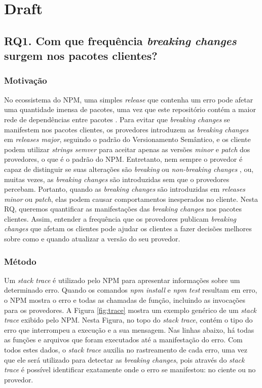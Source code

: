 \chapter{Draft}

\section{RQ1. Com que frequência \textit{breaking changes} surgem nos pacotes clientes?}
\label{sec:rq1}

\subsection{Motivação}
\label{mot:rq1}

No ecossistema do \gls{NPM}, uma simples \textit{release} que contenha um erro pode afetar uma quantidade imensa de pacotes, uma vez que este repositório contém a maior rede de dependências entre pacotes \cite{teorical_reference:npm_2}. Para evitar que \textit{breaking changes} se manifestem nos pacotes clientes, os provedores introduzem as \textit{breaking changes} em \textit{releases major}, seguindo o padrão do Versionamento Semântico, e os cliente podem utilizar \textit{strings semver} para aceitar apenas as versões \textit{minor} e \textit{patch} dos provedores, o que é o padrão do \gls{NPM}. Entretanto, nem sempre o provedor é capaz de distinguir se suas alterações são \textit{breaking} ou \textit{non-breaking changes} \cite{noregrets2018}, ou, muitas vezes, as \textit{breaking changes} são introduzidas sem que o provedores percebam. Portanto, quando as \textit{breaking changes} são introduzidas em \textit{releases minor} ou \textit{patch}, elas podem causar comportamentos inesperados no cliente. Nesta RQ, queremos quantificar as manifestações das \textit{breaking changes} nos pacotes clientes. Assim, entender a frequência que os provedores publicam \textit{breaking changes} que afetam os clientes pode ajudar os clientes a fazer decisões melhores sobre como e quando atualizar a versão do seu provedor.

\subsection{Método}
\label{apr:rq1}

Um \textit{stack trace} é utilizado pelo \gls{NPM} para apresentar informações sobre um determinado erro. Quando os comandos \textit{npm install} e \textit{npm test} resultam em erro, o \Gls{NPM} mostra o erro e todas as chamadas de função, incluindo as invocações para os provedores. A Figura \ref{fig:trace} mostra um exemplo genérico de um \textit{stack trace} exibido pelo \Gls{NPM}. Nesta Figura, no topo do \textit{stack trace}, contém o tipo do erro que interrompeu a execução e a sua mensagem. Nas linhas abaixo, há todas as funções e arquivos que foram executados até a manifestação do erro. Com todos estes dados, o \textit{stack trace} auxilia no rastreamento de cada erro, uma vez que ele será utilizado para detectar as \textit{breaking changes}, pois através do \textit{stack trace} é possível identificar exatamente onde o erro se manifestou: no ciente ou no provedor.

